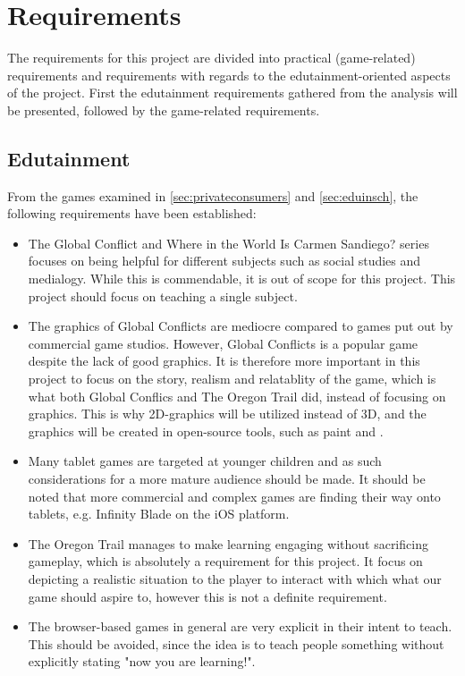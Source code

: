 \section{Requirements}
\label{sec:requirements}

The requirements for this project are divided into practical (game-related) requirements and requirements with regards to the edutainment-oriented 
aspects of the project. First the edutainment requirements gathered from the analysis will be presented, followed by the game-related requirements.

\subsection{Edutainment}

From the games examined in \autoref{sec:privateconsumers} and \autoref{sec:eduinsch}, the following requirements have been established: 

\begin{itemize}
	\item The Global Conflict and Where in the World Is Carmen Sandiego? series focuses on being helpful for different subjects such as social studies and medialogy. While this is commendable, it is out of scope for this project. This project should focus on teaching a single subject.
	
	\item The graphics of Global Conflicts are mediocre compared to games put out by commercial game studios. However, Global Conflicts is a popular game despite the lack of good graphics. It is therefore more important in this project to focus on the story, realism and relatablity of the game, which is what both Global Conflics and The Oregon Trail did, instead of focusing on graphics. This is why 2D-graphics will be utilized instead of 3D, and the graphics will be created in open-source tools, such as paint and .

	\item Many tablet games are targeted at younger children and as such considerations for a more mature audience should be made. It should be noted that more commercial and complex games are finding their way onto tablets, e.g. Infinity Blade on the iOS platform.

	\item The Oregon Trail manages to make learning engaging without sacrificing gameplay, which is absolutely a requirement for this project. It focus on depicting a realistic situation to the player to interact with which what our game should aspire to, however this is not a definite requirement.

	\item The browser-based games in general are very explicit in their intent to teach. This should be avoided, since the idea is to teach people something without explicitly stating "now you are learning!". 
\end{itemize}

